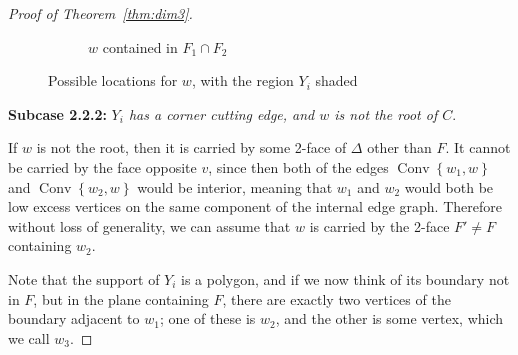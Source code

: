 \documentclass[10pt]{amsart}
\DeclareMathOperator{\Convop}{Conv}
\newcommand{\Conv}[1]{\Convop\left\{{#1}\right\}}
\newenvironment{proofsection}[2]{\par\smallskip\noindent\textbf{#1} \emph{#2}.\par\nobreak}{\par\smallskip}
\begin{document}
\begin{proof}[Proof of Theorem~\ref{thm:dim3}]
\begin{figure}[htb]
\begin{subfigure}{0.35\textwidth}
\caption{$w$ contained in $F_1\cap F_2$}
\label{subfig:w-on-edge}
\end{subfigure}
\hfill{}
\caption{Possible locations for $w$, with the region $Y_i$ shaded}
\label{fig:locations-for-w}
\end{figure}



\begin{proofsection}{Subcase 2.2.2:}{$Y_i$ has a corner cutting edge, and $w$ is not the root of $C$}
If $w$ is not the root, then it is carried by some 2-face of $\Delta$ other than $F$. It cannot be carried by the face opposite $v$, since then both of the edges $\Conv{w_1,w}$ and $\Conv{w_2,w}$ would be interior, meaning that $w_1$ and $w_2$ would both be low excess vertices on the same component of the internal edge graph. Therefore without loss of generality, we can assume that $w$ is carried by the 2-face $F' \neq F$ containing $w_2$.

Note that the support of $Y_i$ is a polygon, and if we now think of its boundary not in $F$, but in the plane containing $F$, there are exactly two vertices of the boundary adjacent to $w_1$; one of these is $w_2$, and the other is some vertex, which we call $w_3$.


\end{proofsection}
\end{proof}
\end{document}
